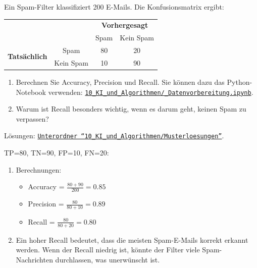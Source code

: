\begin{myexercise}
    Ein Spam-Filter klassifiziert 200 E-Mails.
    Die Konfusionsmatrix ergibt:
    \begin{center}
        \begin{tabular}{cccc}
                                                  &           & \multicolumn{2}{c}{\textbf{Vorhergesagt}} \\
                                                  &           & Spam                                         & Kein Spam \\
            \midrule
            \multirow{2}{*}{\textbf{Tatsächlich}} & Spam      & 80                                           & 20 \\
                                                  & Kein Spam & 10                                           & 90 \\
        \end{tabular}
    \end{center}

    \begin{enumerate}
        \item Berechnen Sie Accuracy, Precision und Recall. Sie können dazu das Python-Notebook verwenden: \href{\notebookurl}{\texttt{10\_KI\_und\_Algorithmen/\_Datenvorbereitung.ipynb}}.
        \item Warum ist Recall besonders wichtig, wenn es darum geht, keinen Spam zu verpassen?
    \end{enumerate}
    \begin{myanswer}
        Lösungen: \href{\notebookurl}{\texttt{Unterordner \enquote{10\_KI\_und\_Algorithmen/Musterloesungen}}}.

        TP=80, TN=90, FP=10, FN=20:
        \begin{enumerate}
            \item Berechnungen:
                  \begin{itemize}
                      \item Accuracy = $\frac{80 + 90}{200} = 0.85$
                      \item Precision = $\frac{80}{80 + 10} = 0.89$
                      \item Recall = $\frac{80}{80 + 20} = 0.80$
                  \end{itemize}
            \item Ein hoher Recall bedeutet, dass die meisten Spam-E-Mails korrekt erkannt werden. Wenn der Recall niedrig ist, könnte der Filter viele Spam-Nachrichten durchlassen, was unerwünscht ist.
        \end{enumerate}
    \end{myanswer}
\end{myexercise}

